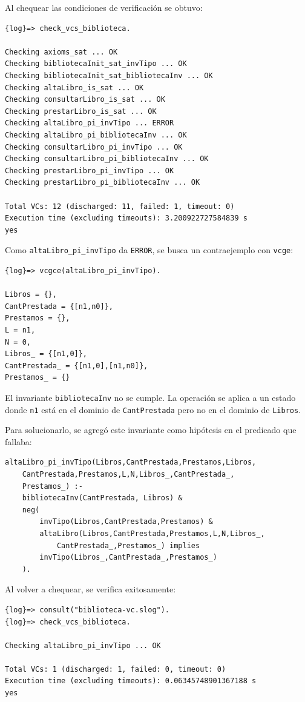 \documentclass{article}
\begin{document}
Al chequear las condiciones de verificación se obtuvo:

\begin{verbatim}
{log}=> check_vcs_biblioteca.

Checking axioms_sat ... OK
Checking bibliotecaInit_sat_invTipo ... OK
Checking bibliotecaInit_sat_bibliotecaInv ... OK
Checking altaLibro_is_sat ... OK
Checking consultarLibro_is_sat ... OK
Checking prestarLibro_is_sat ... OK
Checking altaLibro_pi_invTipo ... ERROR
Checking altaLibro_pi_bibliotecaInv ... OK
Checking consultarLibro_pi_invTipo ... OK
Checking consultarLibro_pi_bibliotecaInv ... OK
Checking prestarLibro_pi_invTipo ... OK
Checking prestarLibro_pi_bibliotecaInv ... OK

Total VCs: 12 (discharged: 11, failed: 1, timeout: 0)
Execution time (excluding timeouts): 3.200922727584839 s
yes
\end{verbatim}

Como \texttt{altaLibro\_pi\_invTipo} da \texttt{ERROR}, se busca un contraejemplo con \texttt{vcge}:
\begin{verbatim}
{log}=> vcgce(altaLibro_pi_invTipo).

Libros = {},  
CantPrestada = {[n1,n0]},  
Prestamos = {},  
L = n1,  
N = 0,  
Libros_ = {[n1,0]},  
CantPrestada_ = {[n1,0],[n1,n0]},  
Prestamos_ = {}
\end{verbatim}

El invariante \texttt{bibliotecaInv} no se cumple. La operación se aplica a un estado donde \texttt{n1} está en el dominio de \texttt{CantPrestada} pero no en el dominio de \texttt{Libros}.

Para solucionarlo, se agregó este invariante como hipótesis en el predicado que fallaba:

\begin{verbatim}
altaLibro_pi_invTipo(Libros,CantPrestada,Prestamos,Libros,
    CantPrestada,Prestamos,L,N,Libros_,CantPrestada_,
    Prestamos_) :-
    bibliotecaInv(CantPrestada, Libros) & 
    neg(
        invTipo(Libros,CantPrestada,Prestamos) &
        altaLibro(Libros,CantPrestada,Prestamos,L,N,Libros_,
            CantPrestada_,Prestamos_) implies
        invTipo(Libros_,CantPrestada_,Prestamos_)
    ).
\end{verbatim}

Al volver a chequear, se verifica exitosamente:
\begin{verbatim}
{log}=> consult("biblioteca-vc.slog").
{log}=> check_vcs_biblioteca.

Checking altaLibro_pi_invTipo ... OK

Total VCs: 1 (discharged: 1, failed: 0, timeout: 0)
Execution time (excluding timeouts): 0.06345748901367188 s
yes
\end{verbatim}
\end{document}
